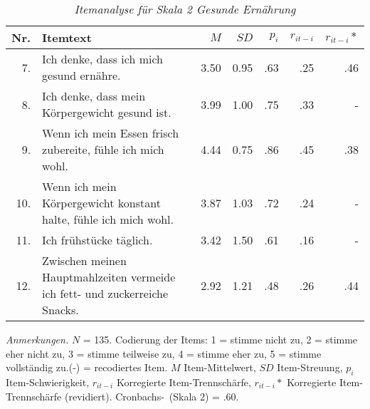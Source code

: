 \begin{table}[htb]
    \caption[Itemanalyse für Skala 2 Gesunde Ernährung]{\textit{Itemanalyse für Skala 2 Gesunde Ernährung}} 
    \label{Itemanalyse für Skala 2 Gesunde Ernährung}
    \centering
    \begin{adjustbox}{width=\textwidth}
    \small
    \begin{tabular}{rlrrrrr}
      \hline
    Nr.      & Itemtext & \( M \) & \( SD \) & \( p_i \) & \( r_{it-i} \) 
             & \( r_{it-i}* \) \\
      \hline
    7.      & Ich denke, dass ich mich gesund ernähre.
      & 3.50	 & 0.95	   & .63	    & .25	    & .46   \\
    8.      & Ich denke, dass mein Körpergewicht gesund ist.
      & 3.99	 & 1.00	   & .75	    & .33	    & -     \\
    9.      & Wenn ich mein Essen frisch zubereite, fühle ich mich wohl.
      & 4.44	 & 0.75	   &.86	        &.45	    & .38   \\
    10.     & Wenn ich mein Körpergewicht konstant halte, fühle ich mich wohl.
      & 3.87	 & 1.03	   & .72	    & .24	    & -     \\
    11.     & Ich frühstücke täglich.
      & 3.42	 & 1.50	   & .61	    & .16	    & -     \\
    12.     & Zwischen meinen Hauptmahlzeiten vermeide ich fett- und zuckerreiche 
    Snacks.
      & 2.92	 & 1.21	   & .48	    & .26	    & .44     \\
       \hline
    \end{tabular}
    \end{adjustbox}
    
    \begin{tablenotes}
        \item \textit{Anmerkungen.} \( N \) = 135. Codierung der Items: 1 = stimme
        nicht zu, 2 = stimme eher nicht zu, 3 = stimme teilweise zu, 4 = stimme eher 
        zu, 5 = stimme vollständig zu.\linebreak(-) = recodiertes Item. \( M \) 
        Item-Mittelwert, \( SD \) Item-Streuung, \( p_i \) Item-Schwierigkeit, 
        \linebreak\( r_{it-i} \) Korregierte Item-Trennschärfe, \( r_{it-i}* \)
        Korregierte Item-Trennschärfe (revidiert). Cronbachs-\textalpha \ (Skala 2) = .60.
      \end{tablenotes}
    \end{table}